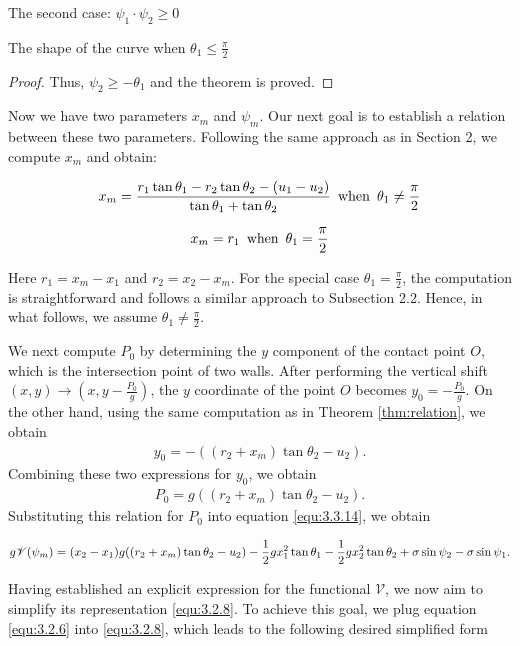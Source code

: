 \documentclass[letterpaper,reqno,10pt,twoside]{amsart}
\theoremstyle{definition}
\theoremstyle{remark}
\begin{document}
\begin{section}{The second case: $\psi_1\cdot \psi_2\geq 0$ }
\begin{subsection}{The shape of the curve when $\theta_1\leq \frac{\pi}{2}$}
\begin{proof}
            \noindent Thus, $\psi_{2}\geq -\theta_{1}$ and the theorem is proved.
        \end{proof}

        Now we have two parameters $x_{m}$ and $\psi_{m}$. Our next goal is to establish a relation between these two parameters. Following the same approach as in Section 2, we compute $x_m$ and obtain:

        \begin{equation}{\label{equ:3.2.6}}
            x_m=\frac{r_1\tan\theta_1-r_2\tan\theta_2-(u_1-u_{2})}{\tan\theta_1+\tan\theta_2}~\operatorname{when}~\theta_1\neq \frac{\pi}{2}
        \end{equation}

        \begin{equation}{\label{equ:3.2.7}}
            x_m=r_1~\operatorname{when}~\theta_1=\frac{\pi}{2}
        \end{equation}

        \noindent Here $r_1=x_m-x_1$ and $r_2=x_2-x_m$. For the special case $\theta_1=\frac{\pi}{2}$, the computation is straightforward and follows a similar approach  to Subsection 2.2. Hence, in what follows, we assume $\theta_1\neq \frac{\pi}{2}$. 
        
         We next compute $P_0$ by determining the $y$ component of the contact point $O$, which is the intersection point of two walls. 
        After performing the vertical shift $(x,y)\rightarrow (x,y-\frac{P_{0}}{g})$, the $y$ coordinate of the point $O$ becomes $y_{0}=-\frac{P_{0}}{g}$.
       On the other hand, using the same computation as in Theorem \ref{thm:relation}, we obtain 
       \begin{align}
       y_{0}=-((r_2+x_m)\tan\theta_2-u_2).
       \end{align}
        Combining these two expressions for $y_{0}$, we obtain 
        \begin{align}
        P_{0}=g((r_2+x_m)\tan\theta_2-u_2).
        \end{align}
        Substituting this relation for $P_{0}$ into equation \eqref{equ:3.3.14}, we obtain

        \begin{equation}{\label{equ:3.2.8}}
           g{\mathscr{V}}(\psi_m)=(x_2-x_1)g((r_2+x_m)\tan\theta_2-u_2)-\frac{1}{2}gx_1^{2}\tan\theta_1-\frac{1}{2}gx_2^{2}\tan\theta_2+\sigma \sin\psi_2-\sigma \sin\psi_1.
        \end{equation}

        Having established an explicit expression for the functional $\mathscr{V}$, we now aim to simplify its representation \eqref{equ:3.2.8}. To achieve this goal, we plug equation \eqref{equ:3.2.6} into \eqref{equ:3.2.8}, which leads to the following desired simplified form


\end{subsection}
\end{section}
\end{document}

